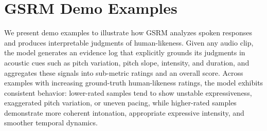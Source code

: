 \section{GSRM Demo Examples} \label{sec:demo}
We present demo examples to illustrate how GSRM analyzes spoken responses and produces interpretable judgments of human-likeness. Given any audio clip, the model generates an evidence log that explicitly grounds its judgments in acoustic cues such as pitch variation, pitch slope, intensity, and duration, and aggregates these signals into sub-metric ratings and an overall score. Across examples with increasing ground-truth human-likeness ratings, the model exhibits consistent behavior: lower-rated samples tend to show unstable expressiveness, exaggerated pitch variation, or uneven pacing, while higher-rated samples demonstrate more coherent intonation, appropriate expressive intensity, and smoother temporal dynamics. 

